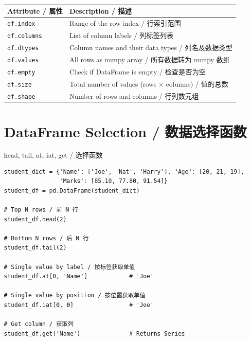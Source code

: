 \documentclass[11pt,a4paper]{article}
\begin{document}
\begin{table}[h]
\centering
\renewcommand{\arraystretch}{1.3}
\begin{tabular}{@{}ll@{}}
\toprule
\textbf{Attribute / 属性} & \textbf{Description / 描述} \\ \midrule
\texttt{df.index}   & Range of the row index / 行索引范围 \\
\texttt{df.columns} & List of column labels / 列标签列表 \\
\texttt{df.dtypes}  & Column names and their data types / 列名及数据类型 \\
\texttt{df.values}  & All rows as numpy array / 所有数据转为 numpy 数组 \\
\texttt{df.empty}   & Check if DataFrame is empty / 检查是否为空 \\
\texttt{df.size}    & Total number of values (rows × columns) / 值的总数 \\
\texttt{df.shape}   & Number of rows and columns / 行列数元组 \\ \bottomrule
\end{tabular}
\end{table}

\section{DataFrame Selection / 数据选择函数}

\begin{examplebox}{head, tail, at, iat, get / 选择函数}
\begin{lstlisting}
student_dict = {'Name': ['Joe', 'Nat', 'Harry'], 'Age': [20, 21, 19],
                'Marks': [85.10, 77.80, 91.54]}
student_df = pd.DataFrame(student_dict)

# Top N rows / 前 N 行
student_df.head(2)

# Bottom N rows / 后 N 行
student_df.tail(2)

# Single value by label / 按标签获取单值
student_df.at[0, 'Name']            # 'Joe'

# Single value by position / 按位置获取单值
student_df.iat[0, 0]                # 'Joe'

# Get column / 获取列
student_df.get('Name')              # Returns Series
\end{lstlisting}
\end{examplebox}
\end{document}
